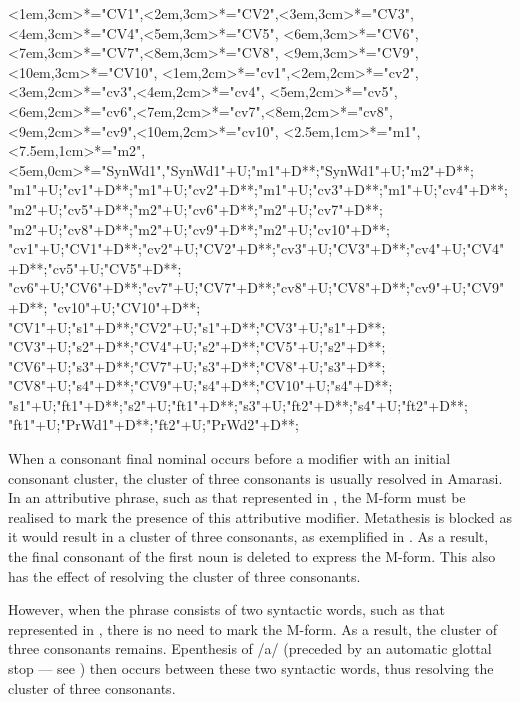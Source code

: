 \begin{multicols}{2}
\begin{exe}
{			<1em,3cm>*="CV1",<2em,3cm>*="CV2",<3em,3cm>*="CV3",
			<4em,3cm>*="CV4",<5em,3cm>*="CV5",
			<6em,3cm>*="CV6",<7em,3cm>*="CV7",<8em,3cm>*="CV8",
			<9em,3cm>*="CV9",<10em,3cm>*="CV10",
			<1em,2cm>*="cv1",<2em,2cm>*="cv2",<3em,2cm>*="cv3",<4em,2cm>*="cv4",
			<5em,2cm>*="cv5",<6em,2cm>*="cv6",<7em,2cm>*="cv7",<8em,2cm>*="cv8",
			<9em,2cm>*="cv9",<10em,2cm>*="cv10",
			<2.5em,1cm>*="m1",<7.5em,1cm>*="m2",
			<5em,0cm>*="SynWd1","SynWd1"+U;"m1"+D**\dir{-};"SynWd1"+U;"m2"+D**\dir{-};
			"m1"+U;"cv1"+D**\dir{-};"m1"+U;"cv2"+D**\dir{-};"m1"+U;"cv3"+D**\dir{-};"m1"+U;"cv4"+D**\dir{-};
			"m2"+U;"cv5"+D**\dir{-};"m2"+U;"cv6"+D**\dir{-};"m2"+U;"cv7"+D**\dir{-};
			"m2"+U;"cv8"+D**\dir{-};"m2"+U;"cv9"+D**\dir{-};"m2"+U;"cv10"+D**\dir{-};
			"cv1"+U;"CV1"+D**\dir{-};"cv2"+U;"CV2"+D**\dir{-};"cv3"+U;"CV3"+D**\dir{-};"cv4"+U;"CV4"+D**\dir{-};"cv5"+U;"CV5"+D**\dir{-};
			"cv6"+U;"CV6"+D**\dir{-};"cv7"+U;"CV7"+D**\dir{-};"cv8"+U;"CV8"+D**\dir{-};"cv9"+U;"CV9"+D**\dir{-};
			"cv10"+U;"CV10"+D**\dir{-};
			"CV1"+U;"s1"+D**\dir{-};"CV2"+U;"s1"+D**\dir{-};"CV3"+U;"s1"+D**\dir{-};
			"CV3"+U;"s2"+D**\dir{-};"CV4"+U;"s2"+D**\dir{-};"CV5"+U;"s2"+D**\dir{-};
			"CV6"+U;"s3"+D**\dir{-};"CV7"+U;"s3"+D**\dir{-};"CV8"+U;"s3"+D**\dir{-};
			"CV8"+U;"s4"+D**\dir{-};"CV9"+U;"s4"+D**\dir{-};"CV10"+U;"s4"+D**\dir{-};
			"s1"+U;"ft1"+D**\dir{-};"s2"+U;"ft1"+D**\dir{-};"s3"+U;"ft2"+D**\dir{-};"s4"+U;"ft2"+D**\dir{-};
			"ft1"+U;"PrWd1"+D**\dir{-};"ft2"+U;"PrWd2"+D**\dir{-};
		\endxy}
	\end{exe}
\end{multicols}

When a consonant final nominal occurs before a 
modifier with an initial consonant cluster,
the cluster of three consonants is usually resolved in Amarasi.
In an attributive phrase, such as that
represented in ,
the M-form must be realised to mark the presence of this attributive modifier.
Metathesis is blocked as it would result in a cluster of three consonants,
as exemplified in .
As a result, the final consonant of the first
noun is deleted to express the M-form.
This also has the effect of resolving the cluster of three consonants.

However, when the phrase consists of two syntactic words,
such as that represented in ,
there is no need to mark the M-form.
As a result, the cluster of three consonants remains.
Epenthesis of /a/ (preceded by an automatic glottal stop
--- see ) then occurs between these two syntactic words,
thus resolving the cluster of three consonants.

